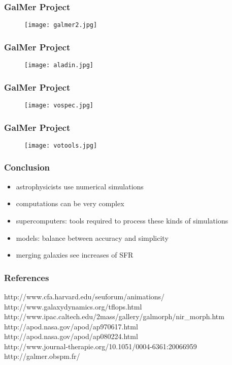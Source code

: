 \documentclass{beamer}
\begin{document}
\begin{frame}
  \frametitle{GalMer Project}
  \begin{figure}
    \texttt{[image: galmer2.jpg]}
  \end{figure}
\end{frame}

\begin{frame}
  \frametitle{GalMer Project}
  \begin{figure}
    \texttt{[image: aladin.jpg]}
  \end{figure}
\end{frame}

\begin{frame}
  \frametitle{GalMer Project}
  \begin{figure}
    \texttt{[image: vospec.jpg]}
  \end{figure}
\end{frame}

\begin{frame}
  \frametitle{GalMer Project}
  \begin{figure}
    \texttt{[image: votools.jpg]}
  \end{figure}
\end{frame}

\begin{frame}
  \frametitle{Conclusion}
  \begin{itemize}
    \item astrophysicists use numerical simulations
    \item computations can be very complex
    \item supercomputers: tools required to process these kinds of simulations
    \item models: balance between accuracy and simplicity
    \item merging galaxies see increases of SFR
  \end{itemize}
\end{frame}

\begin{frame}
  \frametitle{References}
    http://www.cfa.harvard.edu/seuforum/animations/
    \\ http://www.galaxydynamics.org/tflops.html
    \\ http://www.ipac.caltech.edu/2mass/gallery/galmorph/nir\_morph.htm
    \\ http://apod.nasa.gov/apod/ap970617.html
    \\ http://apod.nasa.gov/apod/ap080224.html
    \\ http://www.journal-therapie.org/10.1051/0004-6361:20066959
    \\ http://galmer.obspm.fr/
\end{frame}
\end{document}
